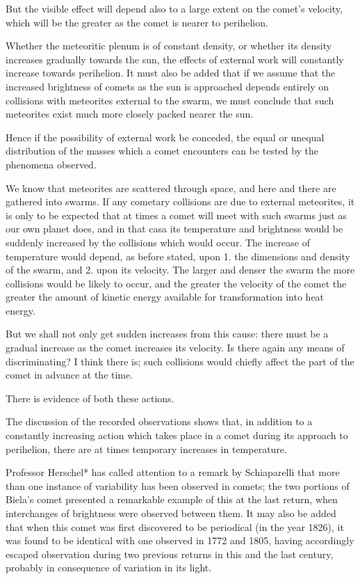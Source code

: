 \documentclass[a4paper, 12pt, oneside, polutonikogreek, english]{article}
\begin{document}
But the visible effect will depend also to a large extent on the comet's velocity, which will be the greater as the comet is nearer to perihelion.

Whether the meteoritic plenum is of constant density, or whether its density increases gradually towards the sun, the effects of external work will constantly increase towards perihelion. It must also be added that if we assume that the increased brightness of comets as the sun is approached depends entirely on collisions with meteorites external to the swarm, we must conclude that such meteorites exist much more closely packed nearer the sun.

Hence if the possibility of external work be conceded, the equal or unequal distribution of the masses which a comet encounters can be tested by the phenomena observed.

We know that meteorites are scattered through space, and here and there are gathered into swarms. If any cometary collisions are due to external meteorites, it is only to be expected that at times a comet will meet with such swarms just as our own planet does, and in that casa its temperature and brightness would be suddenly increased by the collisions which would occur. The increase of temperature would depend, as before stated, upon 1. the dimensions and density of the swarm, and 2. upon its velocity. The larger and denser the swarm the more collisions would be likely to occur, and the greater the velocity of the comet the greater the amount of kinetic energy available for transformation into heat energy.

But we shall not only get sudden increases from this cause: there must be a gradual increase as the comet increases its velocity. Is there again any means of discriminating? I think there is; such collisions would chiefly affect the part of the comet in advance at the time.

There is evidence of both these actions.

The discussion of the recorded observations shows that, in addition to a constantly increasing action which takes place in a comet during its approach to perihelion, there are at times temporary increases in temperature.

Professor Herschel* has called attention to a remark by Schiaparelli that more than one instance of variability has been observed in comets; the two portions of Biela's comet presented a remarkable example of this at the last return, when interchanges of brightness were observed between them. It may also be added that when this comet was first discovered to be periodical (in the year 1826), it was found to be identical with one observed in 1772 and 1805, having accordingly escaped observation during two previous returns in this and the last century, probably in consequence of variation in its light.
\end{document}
